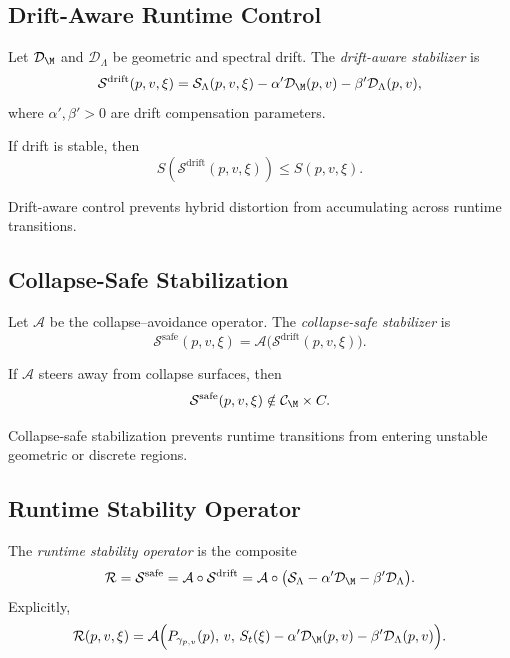 \subsection{Drift-Aware Runtime Control}

\begin{definition}
Let $\mathcal{D}_\M$ and $\mathcal{D}_\Lambda$ be geometric and spectral drift.
The \emph{drift-aware stabilizer} is
\[
\mathcal{S}^\mathrm{drift}(p,v,\xi)
= \mathcal{S}_{\Lambda}(p,v,\xi)
- \alpha' \mathcal{D}_\M(p,v)
- \beta' \mathcal{D}_\Lambda(p,v),
\]
where $\alpha',\beta' > 0$ are drift compensation parameters.
\end{definition}

\begin{lemma}
If drift is stable, then
\[
S(\mathcal{S}^\mathrm{drift}(p,v,\xi))
\le S(p,v,\xi).
\]
\end{lemma}

\begin{remark}
Drift-aware control prevents hybrid distortion from accumulating across
runtime transitions.
\end{remark}

\subsection{Collapse-Safe Stabilization}

\begin{definition}
Let $\mathcal{A}$ be the collapse--avoidance operator.  
The \emph{collapse-safe stabilizer} is
\[
\mathcal{S}^\mathrm{safe}(p,v,\xi)
= \mathcal{A}\big( \mathcal{S}^\mathrm{drift}(p,v,\xi) \big).
\]
\end{definition}

\begin{lemma}
If $\mathcal{A}$ steers away from collapse surfaces, then
\[
\mathcal{S}^\mathrm{safe}(p,v,\xi)
\notin \mathcal{C}_\M \times C.
\]
\end{lemma}

\begin{remark}
Collapse-safe stabilization prevents runtime transitions from entering
unstable geometric or discrete regions.
\end{remark}

\subsection{Runtime Stability Operator}

\begin{definition}
The \emph{runtime stability operator} is the composite
\[
\mathcal{R}
= \mathcal{S}^\mathrm{safe}
= \mathcal{A} \circ \mathcal{S}^\mathrm{drift}
= \mathcal{A} \circ \big( \mathcal{S}_{\Lambda}
- \alpha' \mathcal{D}_\M
- \beta' \mathcal{D}_\Lambda \big).
\]
Explicitly,
\[
\mathcal{R}(p,v,\xi)
= \mathcal{A}\Big(
P_{\gamma_{p,v}}(p),\,
v,\,
S_t(\xi)
- \alpha' \mathcal{D}_\M(p,v)
- \beta' \mathcal{D}_\Lambda(p,v)
\Big).
\]
\end{definition}

